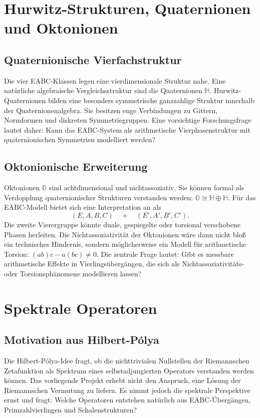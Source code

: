 \documentclass[11pt,a4paper,bibliography=totoc]{scrartcl}
\begin{document}
	\section{Hurwitz-Strukturen, Quaternionen und Oktonionen}
	
	\subsection{Quaternionische Vierfachstruktur}
	Die vier EABC-Klassen legen eine vierdimensionale Struktur nahe. Eine natürliche algebraische Vergleichsstruktur sind die Quaternionen $\mathbb{H}$. Hurwitz-Quaternionen bilden eine besonders symmetrische ganzzahlige Struktur innerhalb der Quaternionenalgebra. Sie besitzen enge Verbindungen zu Gittern, Normformen und diskreten Symmetriegruppen. Eine vorsichtige Forschungsfrage lautet daher: Kann das EABC-System als arithmetische Vierphasenstruktur mit quaternionischen Symmetrien modelliert werden?
	
	\subsection{Oktonionische Erweiterung}
	Oktonionen $\mathbb{O}$ sind achtdimensional und nichtassoziativ. Sie können formal als Verdopplung quaternionischer Strukturen verstanden werden: $\mathbb{O} \cong \mathbb{H} \oplus \mathbb{H}$. Für das EABC-Modell bietet sich eine Interpretation an als
	\[
	(E, A, B, C) \quad + \quad (E', A', B', C').
	\]
	Die zweite Vierergruppe könnte duale, gespiegelte oder torsional verschobene Phasen herleiten. Die Nichtassoziativität der Oktonionen wäre dann nicht bloß ein technisches Hindernis, sondern möglicherweise ein Modell für arithmetische Torsion: $(ab)c - a(bc) \neq 0$. Die zentrale Frage lautet: Gibt es messbare arithmetische Effekte in Vierlingsübergängen, die sich als Nichtassoziativitäts- oder Torsionsphänomene modellieren lassen?
	
	\section{Spektrale Operatoren}
	
	\subsection{Motivation aus Hilbert-Pólya}
	Die Hilbert-Pólya-Idee fragt, ob die nichttrivialen Nullstellen der Riemannschen Zetafunktion als Spektrum eines selbstadjungierten Operators verstanden werden können. Das vorliegende Projekt erhebt nicht den Anspruch, eine Lösung der Riemannschen Vermutung zu liefern. Es nimmt jedoch die spektrale Perspektive ernst und fragt: Welche Operatoren entstehen natürlich aus EABC-Übergängen, Primzahlvierlingen und Schalenstrukturen?
	
\end{document}
